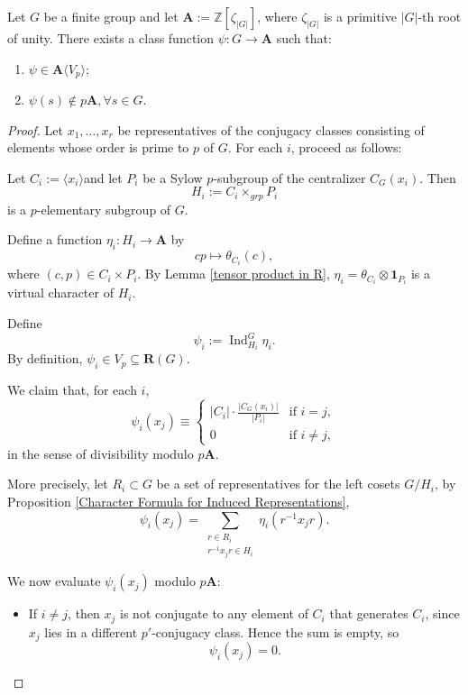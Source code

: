 \begin{lemma}
\label{existence of nonzero function}
Let $G$ be a finite group and let \(\mathbf{A} := \mathbb{Z}[\zeta_{|G|}]\), where \(\zeta_{|G|}\) is a primitive \(|G|\)-th root of unity. There exists a class function \(\psi: G \to \mathbf{A}\) such that:
\begin{enumerate}
    \item \(\psi \in \mathbf{A}\langle V_p\rangle\);
    \item \(\psi(s) \notin{p\mathbf{A}},\forall s \in G\).
\end{enumerate}
\end{lemma}
\begin{proof}
Let \( x_1, \dots, x_r \) be representatives of the conjugacy classes consisting of elements whose order is prime to \( p \) of \( G\). For each \( i \), proceed as follows:

Let \( C_i := \langle x_i \rangle \)and let \( P_i \) be a Sylow \( p \)-subgroup of the centralizer \( C_G(x_i) \). Then
\[
H_i := C_i \times_{grp} P_i
\]
is a \( p \)-elementary subgroup of \( G \).

Define a function \( \eta_i : H_i \to \mathbf{A} \) by
\[
c p\mapsto \theta_{C_i}(c),
\]
where $(c,p)\in C_i \times P_i$. By Lemma \ref{tensor product in R}, \( \eta_i =\theta_{C_i}\otimes\mathbf 1_{P_i}\) is a virtual character of \( H_i \).

Define
\[
\psi_i := \operatorname{Ind}_{H_i}^G \eta_i.
\]
By definition, \( \psi_i \in V_p \subseteq \mathbf{R}(G) \).

We claim that, for each \( i \),
\[
\psi_i(x_j) \equiv
\begin{cases}
|C_i| \cdot \frac{|C_G(x_i)|}{|P_i|} & \text{if } i = j, \\
0 & \text{if } i \neq j,
\end{cases}
\]
in the sense of divisibility modulo \( p\mathbf{A} \). 

More precisely, let \( R_i \subset G \) be a set of representatives for the left cosets \( G/H_i \), by Proposition \ref{Character Formula for Induced Representations},
\[
\psi_i(x_j) = \sum_{\substack{r \in R_i \\ r^{-1} x_j r \in H_i}} \eta_i(r^{-1} x_j r).
\]

We now evaluate \(\psi_i(x_j)\) modulo \(p\mathbf{A}\):

\begin{itemize}
    \item If \(i \neq j\), then \(x_j\) is not conjugate to any element of \(C_i\) that generates \(C_i\), since \(x_j\) lies in a different \(p'\)-conjugacy class. Hence the sum is empty, so
    \[
    \psi_i(x_j) = 0.
    \]


\end{itemize}
\end{proof}
